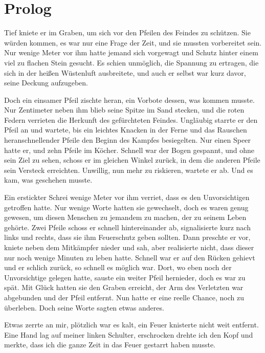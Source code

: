 \chapter{Prolog}
\label{cha:prolog}
Tief kniete er im Graben, um sich vor den Pfeilen des Feindes zu schützen. Sie würden kommen, es war nur eine Frage der Zeit, und sie mussten vorbereitet sein. Nur wenige Meter vor ihm hatte jemand sich vorgewagt und Schutz hinter einem viel zu flachen Stein gesucht. Es schien unmöglich, die Spannung zu ertragen, die sich in der heißen Wüstenluft ausbreitete, und auch er selbst war kurz davor, seine Deckung aufzugeben.

Doch ein einsamer Pfeil zischte heran, ein Vorbote dessen, was kommen musste. Nur Zentimeter neben ihm blieb seine Spitze im Sand stecken, und die roten Federn verrieten die Herkunft des gefürchteten Feindes. Ungläubig starrte er den Pfeil an und wartete, bis ein leichtes Knacken in der Ferne und das Rauschen heranschnellender Pfeile den Beginn des Kampfes besiegelten.
Nur einen Speer hatte er, und zehn Pfeile im Köcher. Schnell war der Bogen gespannt, und ohne sein Ziel zu sehen, schoss er im gleichen Winkel zurück, in dem die anderen Pfeile sein Versteck erreichten. 
Unwillig, nun mehr zu riskieren, wartete er ab. Und es kam, was geschehen musste.

Ein erstickter Schrei wenige Meter vor ihm verriet, dass es den Unvorsichtigen getroffen hatte. Nur wenige Worte hatten sie gewechselt, doch es waren genug gewesen, um diesen Menschen zu jemandem zu machen, der zu seinem Leben gehörte. 
Zwei Pfeile schoss er schnell hintereinander ab, signalisierte kurz nach links und rechts, dass sie ihm Feuerschutz geben sollten. Dann preschte er vor, kniete neben dem Mitkämpfer nieder und sah, aber realisierte nicht, dass dieser nur noch wenige Minuten zu leben hatte. Schnell war er auf den Rücken gehievt und er schlich zurück, so schnell es möglich war. Dort, wo eben noch der Unvorsichtige gelegen hatte, sauste ein weiter Pfeil hernieder, doch es war zu spät. Mit Glück hatten sie den Graben erreicht, der Arm des Verletzten war abgebunden und der Pfeil entfernt. Nun hatte er eine reelle Chance, noch zu überleben. 
Doch seine Worte sagten etwas anderes.

Etwas zerrte an mir, plötzlich war es kalt, ein Feuer knisterte nicht weit entfernt. Eine Hand lag auf meiner linken Schulter, erschrocken drehte ich den Kopf und merkte, dass ich die ganze Zeit in das Feuer gestarrt haben musste.

